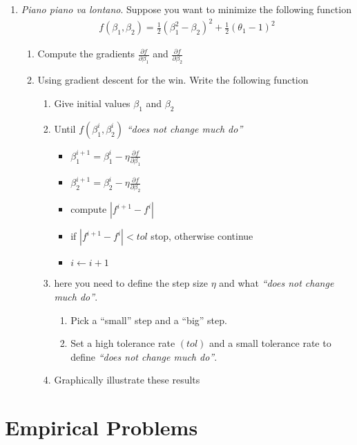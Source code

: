 \documentclass[12pt,onecolumn,A4]{article}
\begin{document}
\begin{enumerate}
  \item {\it Piano piano va lontano}. Suppose you want to minimize the following function 
  \begin{align}
  f(\beta_1,\beta_2)=\frac{1}{2}(\beta_1^2-\beta_2)^2+ \frac{1}{2}(\theta_1-1)^2
  \end{align}
  \begin{enumerate}
    \item Compute the gradients $\frac{\partial f}{\partial \beta_1}$ and $\frac{\partial f}{\partial \beta_2}$
    \item Using gradient descent for the win. Write the following function
    \begin{enumerate}
      \item Give initial values $\beta_1$ and $\beta_2$
      \item Until $f(\beta^i_1,\beta^i_2)$ {\it ``does not change much do''}
      \begin{itemize}
       \item $\beta_1^{i+1} = \beta_1^{i} - \eta \frac{\partial f}{\partial \beta_1}$
       \item $\beta_2^{i+1} = \beta_2^{i} - \eta \frac{\partial f}{\partial \beta_2}$
       \item compute $|f^{i+1}-f^{i}|$
       \item if $|f^{i+1}-f^{i}|<tol$ stop, otherwise continue
       \item $i \leftarrow i+1$
      \end{itemize}
      \item here you need to define the step size $\eta$ and what {\it ``does not change much do''}. 
      \begin{enumerate}
        \item Pick a ``small'' step and a ``big'' step. 
        \item Set a high tolerance rate $(tol)$ and a small tolerance rate to define {\it ``does not change much do''}. 
      \end{enumerate}
      \item Graphically illustrate these results
    \end{enumerate}
  \end{enumerate}
\end{enumerate}



\section{Empirical Problems}
\end{document}
